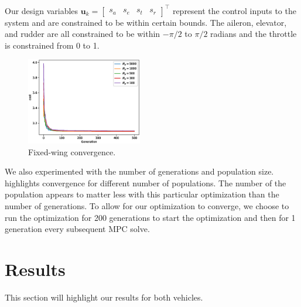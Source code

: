 \documentclass[letterpaper, 10 pt, conference]{ieeeconf}  %
\begin{document}
	
	
	
	Our design variables $\mathbf{u}_k =\begin{bmatrix}s_{a} & s_{e} & s_{t} & s_{r}\end{bmatrix}^{\top}$ represent the control inputs to the system and are constrained to be within certain bounds. The aileron, elevator, and rudder are all constrained to be within $-\pi/2$ to $\pi/2$ radians and the throttle is constrained from 0 to 1. 
	
	
	
	\begin{figure}[htbp]
		\centering
		\includegraphics[width=0.45\textwidth]{figures/fixedwing_convergence.eps}
		\caption{Fixed-wing convergence.}
		\label{fig:fw_convergence}
	\end{figure}
	
	
	We also experimented with the number of generations and population size.  highlights convergence for different number of populations. The number of the population appears to matter less with this particular optimization than the number of generations. To allow for our optimization to converge, we choose to run the optimization for 200 generations to start the optimization and then for 1 generation every subsequent MPC solve.
	
	\section{Results}
	
	This section will highlight our results for both vehicles. 
	
\end{document}
